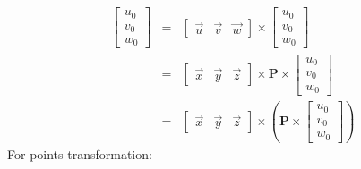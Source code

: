 \documentclass[12pt]{article}
\begin{document}
        \begin{eqnarray*}
            \left[ \begin{array}{c} u_0 \\ v_0 \\ w_0 \end{array} \right] &
            = &
            \left[ \begin{array}{ccc}
                \overrightarrow{u} & \overrightarrow{v} & \overrightarrow{w}
            \end{array} \right]
            \times
            \left[ \begin{array}{c} u_0 \\ v_0 \\ w_0 \end{array} \right] \\
            & = &
            \left[ \begin{array}{ccc}
            \overrightarrow{x} & \overrightarrow{y} & \overrightarrow{z}
            \end{array} \right]
            \times
            \textbf{P}
            \times
            \left[ \begin{array}{c} u_0 \\ v_0 \\ w_0 \end{array} \right] \\
            & = &
            \left[ \begin{array}{ccc}
            \overrightarrow{x} & \overrightarrow{y} & \overrightarrow{z}
            \end{array} \right]
            \times
            \left(
                \textbf{P}
                \times
                \left[ \begin{array}{c} u_0 \\ v_0 \\ w_0 \end{array} \right]
            \right)
        \end{eqnarray*}
        For points transformation:
\end{document}
